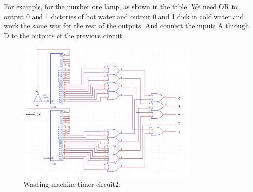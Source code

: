 \documentclass[12pt]{article}
\begin{document}
For example, for the number one lamp, as shown in the table. We need  OR to output 0 and 1 dictories of hot water and output 0 and 1 dick in cold water and work the same way for the rest of the outputs. And connect the inputs A through D to the outputs of the previous circuit.
 \begin{figure}[H]
\centering
\includegraphics[width=0.8\textwidth]{Circuit2}
\caption{\label{fig:Circuit2}Washing machine timer circuit2.}
\end{figure}
\end{document}
